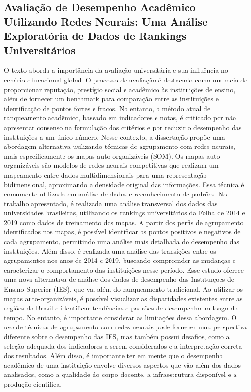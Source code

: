 \documentclass[conference]{IEEEtran}
\begin{document}
\subsection{Avaliação de Desempenho Acadêmico Utilizando Redes Neurais: Uma Análise Exploratória de Dados de Rankings Universitários\cite{b4}}
O texto aborda a importância da avaliação universitária e sua influência no cenário educacional global. O processo de avaliação é destacado como um meio de proporcionar reputação, prestígio social e acadêmico às instituições de ensino, além de fornecer um benchmark para comparação entre as instituições e identificação de pontos fortes e fracos.
No entanto, o método atual de ranqueamento acadêmico, baseado em indicadores e notas, é criticado por não apresentar consenso na formulação dos critérios e por reduzir o desempenho das instituições a um único número. Nesse contexto, a dissertação propõe uma abordagem alternativa utilizando técnicas de agrupamento com redes neurais, mais especificamente os mapas auto-organizáveis (SOM).
Os mapas auto-organizáveis são modelos de redes neurais competitivas que realizam um mapeamento entre dados multidimensionais para uma representação bidimensional, aproximando a densidade original das informações. Essa técnica é comumente utilizada em análise de dados e reconhecimento de padrões. No trabalho apresentado, é realizada uma análise transversal dos dados das universidades brasileiras, utilizando os rankings universitários da Folha de 2014 e 2019 como dados de treinamento dos mapas.
A partir dos perfis de agrupamento identificados nos mapas, é possível identificar os pontos positivos e negativos de cada agrupamento, permitindo uma análise mais detalhada do desempenho das instituições. Além disso, é realizada uma análise das transições entre os agrupamentos nos anos de 2014 e 2019, buscando compreender as mudanças e caracterizar o comportamento das instituições nesse período.
Esse estudo oferece uma nova alternativa de análise dos dados de desempenho das Instituições de Ensino Superior (IES), que vai além do ranqueamento tradicional. Ao utilizar os mapas auto-organizáveis, é possível visualizar as disparidades existentes entre as regiões do Brasil e identificar tendências e padrões de desempenho ao longo do tempo.
No entanto, é importante considerar as limitações dessa abordagem. O uso de técnicas de agrupamento com redes neurais pode fornecer uma perspectiva diferente sobre o desempenho das IES, mas também possui desafios, como a seleção adequada dos indicadores a serem considerados e a interpretação correta dos resultados. Além disso, é importante ter em mente que o desempenho acadêmico de uma instituição envolve diversos aspectos que vão além dos dados analisados, como a qualidade do corpo docente, a infraestrutura disponível e a produção científica.
\end{document}
